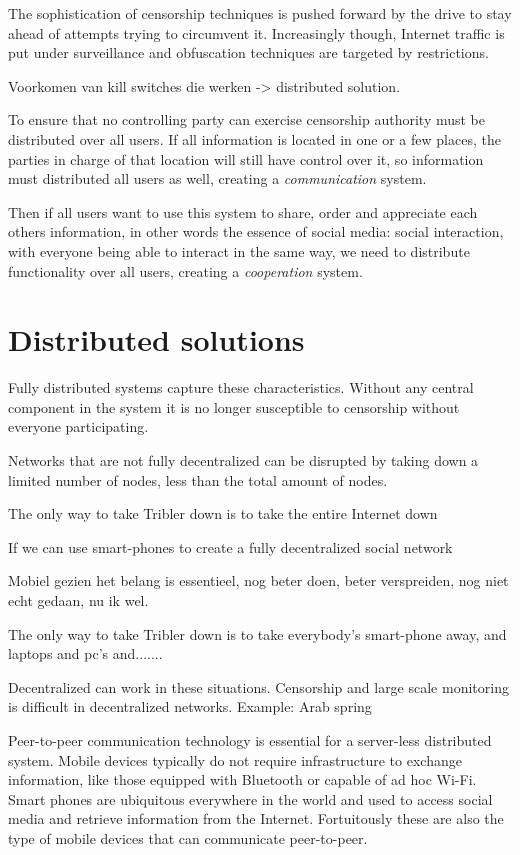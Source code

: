The sophistication of censorship techniques is pushed forward by the drive to stay ahead of attempts trying to circumvent it.
Increasingly though, Internet traffic is put under surveillance and obfuscation techniques are targeted by restrictions.




Voorkomen van kill switches die werken -> distributed solution.

To ensure that no controlling party can exercise censorship authority must be distributed over all users. %
If all information is located in one or a few places, the parties in charge of that location will still have control over it, so information must distributed all users as well, creating a \emph{communication} system.

Then if all users want to use this system to share, order and appreciate each others information, in other words the essence of social media: social interaction, with everyone being able to interact in the same way, we need to  distribute functionality over all users, creating a \emph{cooperation} system.


\section{Distributed solutions}
Fully distributed systems capture these characteristics.
Without any central component in the system it is no longer susceptible to censorship without everyone participating.


Networks that are not fully decentralized can be disrupted by taking down a limited number of nodes, less than the total amount of nodes.


The only way to take Tribler down is to take the entire Internet down

If we can use smart-phones to create a fully decentralized social network %

Mobiel gezien het belang is essentieel, nog beter doen, beter verspreiden, nog niet echt gedaan, nu ik wel.

The only way to take Tribler down is to take everybody's smart-phone away, and laptops and pc's and.......


Decentralized can work in these situations.
Censorship and large scale monitoring is difficult in decentralized networks.
Example: Arab spring \cite{Johan_2001}

Peer-to-peer communication technology is essential for a server-less distributed system.
Mobile devices typically do not require infrastructure to exchange information, like those equipped with Bluetooth or capable of ad hoc Wi-Fi.
Smart phones are ubiquitous everywhere in the world and used to access social media and retrieve information from the Internet.
Fortuitously these are also the type of mobile devices that can communicate peer-to-peer.




